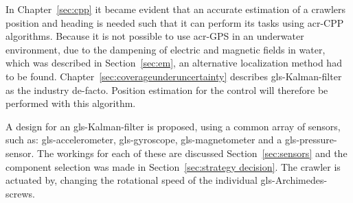 In Chapter~\ref{sec:cpp} it became evident that an accurate estimation of a crawlers position and heading is needed
such that it can perform its tasks using \gls{acr-CPP} algorithms. Because it is not possible to use \gls{acr-GPS} in an
underwater environment, due to the dampening of electric and magnetic fields in water, which was described in
Section~\ref{sec:em}, an alternative localization method had to be found. Chapter~\ref{sec:coverageunderuncertainty}
describes \gls{gls-Kalman-filter} as the industry de-facto. Position estimation for the control will therefore be
performed with this algorithm.

A design for an \gls{gls-Kalman-filter} is proposed, using a common array of sensors, such as: \gls{gls-accelerometer},
\gls{gls-gyroscope}, \gls{gls-magnetometer} and a \gls{gls-pressure-sensor}. The workings for each of these are
discussed Section~\ref{sec:sensors} and the component selection was made in Section~\ref{sec:strategy decision}. The
crawler is actuated by, changing the rotational speed of the individual \gls{gls-Archimedes-screw}s.

